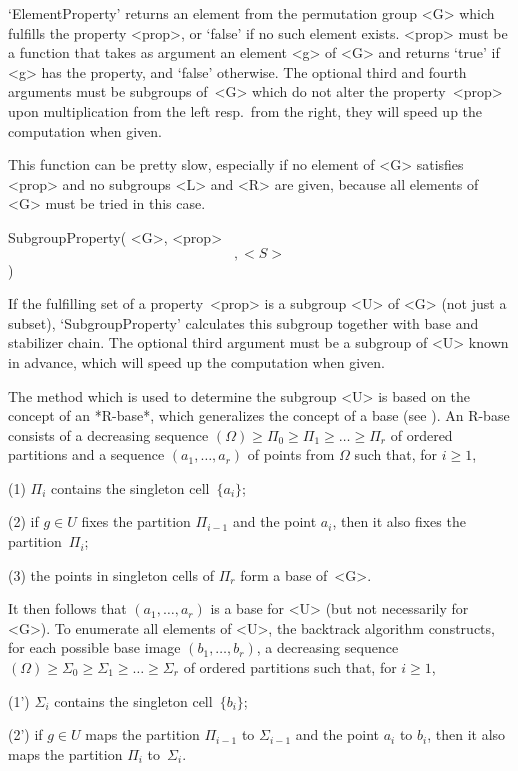 `ElementProperty' returns an element from the permutation group <G> which
fulfills the  property <prop>,  or `false'  if   no such  element exists.
<prop> must be a {\GAP} function that takes as argument an element <g> of
<G>  and returns `true'  if <g> has  the property, and `false' otherwise.
The optional third and fourth arguments must be subgroups of~<G> which do
not alter  the property~<prop> upon multiplication   from the left resp.\
from the right, they will speed up the computation when given.

This function  can  be pretty  slow,  especially  if  no  element of  <G>
satisfies  <prop> and  no  subgroups <L> and  <R> are  given, because all
elements of <G> must be tried in this case.

\>SubgroupProperty( <G>, <prop> \[, <S> \] )

If the fulfilling set of a property~<prop> is a  subgroup <U> of <G> (not
just a subset), `SubgroupProperty' calculates this subgroup together with
base and stabilizer chain. The optional third argument must be a subgroup
of <U> known in advance, which will speed up the computation when given.

\danger The method which  is used to determine the  subgroup <U> is based
on the concept  of an *R-base*, which generalizes  the concept  of a base
(see  \cite{Leon91}).   An  R-base  consists  of a   decreasing  sequence
$(\Omega) \ge \Pi_0 \ge \Pi_1 \ge \ldots \ge \Pi_r$ of ordered partitions
and a sequence $(a_1,\ldots,a_r)$ of  points from $\Omega$ such that, for
$i\ge 1$,
\beginlist
  \item{(1)} $\Pi_i$ contains the singleton cell~$\{a_i\}$;
  \item{(2)} if $g\in  U$ fixes the partition  $\Pi_{i-1}$ and the  point
    $a_i$, then it also fixes the partition~$\Pi_i$;
  \item{(3)} the points in singleton cells of $\Pi_r$ form a base of~<G>.
\endlist

It  then  follows that  $(a_1,\ldots,a_r)$  is  a base  for  <U> (but not
necessarily  for <G>).  To enumerate all  elements of  <U>, the backtrack
algorithm constructs, for each possible  base image $(b_1,\ldots,b_r)$, a
decreasing sequence  $(\Omega) \ge \Sigma_0  \ge  \Sigma_1 \ge \ldots \ge
\Sigma_r$ of ordered partitions such that, for $i\ge 1$,
\beginlist
  \item{(1')} $\Sigma_i$ contains the singleton cell~$\{b_i\}$;
  \item{(2')}    if  $g\in U$     maps    the partition $\Pi_{i-1}$    to
    $\Sigma_{i-1}$  and the point $a_i$ to  $b_i$, then it  also maps the
    partition $\Pi_i$ to~$\Sigma_i$.
\endlist

